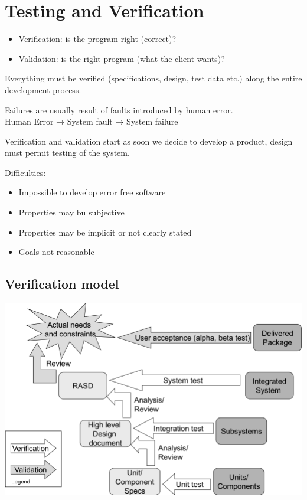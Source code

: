 \section{Testing and Verification}
\begin{itemize}
\item Verification: is the program right (correct)?
\item Validation: is the right program (what the client wants)?
\end{itemize}

Everything must be verified (specifications, design, test data etc.) along the entire development process.

Failures are usually result of faults introduced by human error.\\
Human Error → System fault → System failure

Verification and validation start as soon we decide to develop a product, design must permit testing of the system.

Difficulties:
\begin{itemize}
    \item Impossible to develop error free software
    \item Properties may bu subjective
    \item Properties may be implicit or not clearly stated
    \item Goals not reasonable
\end{itemize}

\subsection{Verification model}
\includegraphics[width=\linewidth]{7-testing/v-model.png}

